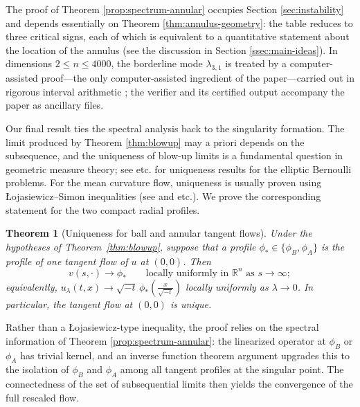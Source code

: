 \documentclass[11pt]{article}
\numberwithin{equation}{section}
\newtheorem{theorem}{Theorem}[section]
\theoremstyle{definition}
\newcommand{\RR}{\mathbb{R}}
\begin{document}
The proof of Theorem \ref{prop:spectrum-annular} occupies Section \ref{sec:instability} and depends essentially on Theorem \ref{thm:annulus-geometry}: the table reduces to three critical signs, each of which is equivalent to a quantitative statement about the location of the annulus (see the discussion in Section \ref{ssec:main-ideas}). In dimensions $2\leq n\leq4000$, the borderline mode $\lambda_{3,1}$ is treated by a computer-assisted proof---the only computer-assisted ingredient of the paper---carried out in rigorous interval arithmetic \cite{arb}; the verifier and its certified output accompany the paper as ancillary files.
\medskip

Our final result ties the spectral analysis back to the singularity formation. The limit produced by Theorem \ref{thm:blowup} may a priori depends on the subsequence, and the uniqueness of blow-up limits is a fundamental question in geometric measure theory; see \cite{AC, DS, ESV20, DSS-AltP, DPSV-twophase, AKN-ACF, ERZ25} etc. for uniqueness results for the elliptic Bernoulli problems. For the mean curvature flow, uniqueness is usually proven using {\L}ojasiewicz--Simon inequalities (see \cite{Schulze, CM-uniqueness, CM-highercodim, Chodosh-Schulze, Lee-Zhao, Zhu} and \cite{Bamler-Lai} etc.). 
We prove the corresponding statement for the two compact radial profiles.

\begin{theorem}[Uniqueness for ball and annular tangent flows]\label{thm:compact-radial-tangent-uniqueness}
    Under the hypotheses of Theorem~\ref{thm:blowup}, suppose that a profile $\phi_*\in\{\phi_B,\phi_A\}$ is the profile of one tangent flow of $u$ at $(0,0)$. Then
    \[
        v(s,\cdot)\longrightarrow \phi_*
        \qquad\text{locally uniformly in $\RR^n$ as $s\to\infty$};
    \]
    equivalently, $u_\lambda(t,x)\to\sqrt{-t}\,\phi_*\!\left(\tfrac{x}{\sqrt{-t}}\right)$ locally uniformly as $\lambda\to0$. In particular, the tangent flow at $(0,0)$ is unique.
\end{theorem}

Rather than a {\L}ojasiewicz-type inequality, the proof relies on the spectral information of Theorem \ref{prop:spectrum-annular}: the linearized operator at $\phi_B$ or $\phi_A$ has trivial kernel, and an inverse function theorem argument upgrades this to the isolation of $\phi_B$ and $\phi_A$ among all tangent profiles at the singular point. The connectedness of the set of subsequential limits then yields the convergence of the full rescaled flow.
\end{document}
